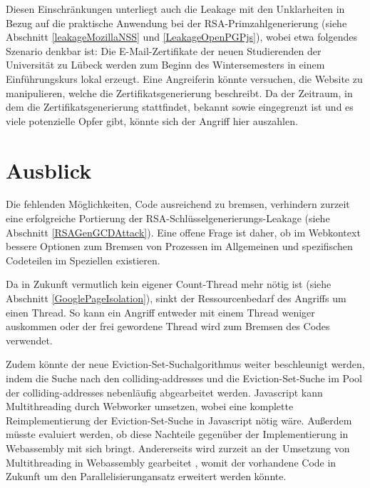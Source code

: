 Diesen Einschränkungen unterliegt auch die Leakage mit den Unklarheiten in Bezug auf die praktische Anwendung bei der RSA-Primzahlgenerierung (siehe Abschnitt \ref{leakageMozillaNSS} und \ref{LeakageOpenPGPjs}), wobei etwa folgendes Szenario denkbar ist:
Die E-Mail-Zertifikate der neuen Studierenden der Universität zu Lübeck werden zum Beginn des Wintersemesters in einem Einführungskurs lokal erzeugt. 
Eine Angreiferin könnte versuchen, die Website zu manipulieren, welche die Zertifikatsgenerierung beschreibt.
Da der Zeitraum, in dem die Zertifikatsgenerierung stattfindet, bekannt sowie eingegrenzt ist und es viele potenzielle Opfer gibt, könnte sich der Angriff hier auszahlen.


\section{Ausblick}


Die fehlenden Möglichkeiten, Code ausreichend zu bremsen, verhindern zurzeit eine erfolgreiche Portierung der RSA-Schlüsselgenerierungs-Leakage (siehe Abschnitt \ref{RSAGenGCDAttack}).
Eine offene Frage ist daher, ob im Webkontext bessere Optionen zum Bremsen von Prozessen im Allgemeinen und spezifischen Codeteilen im Speziellen existieren.

Da in Zukunft vermutlich kein eigener Count-Thread mehr nötig ist (siehe Abschnitt \ref{GooglePageIsolation}), sinkt der Ressourcenbedarf des Angriffs um einen Thread.
So kann ein Angriff entweder mit einem Thread weniger auskommen oder der frei gewordene Thread wird zum Bremsen des Codes verwendet.

Zudem könnte der neue Eviction-Set-Suchalgorithmus weiter beschleunigt werden, indem die Suche nach den colliding-addresses und die Eviction-Set-Suche im Pool der colliding-addresses nebenläufig abgearbeitet werden.
Javascript kann Multithreading durch Webworker umsetzen, wobei eine komplette Reimplementierung der Eviction-Set-Suche in Javascript nötig wäre.
Außerdem müsste evaluiert werden, ob diese Nachteile gegenüber der Implementierung in Webassembly mit sich bringt. 
Andererseits wird zurzeit an der Umsetzung von Multithreading in Webassembly gearbeitet \cite{WebassemblyThreads}, womit der vorhandene Code in Zukunft um den Parallelisierungansatz erweitert werden könnte.

